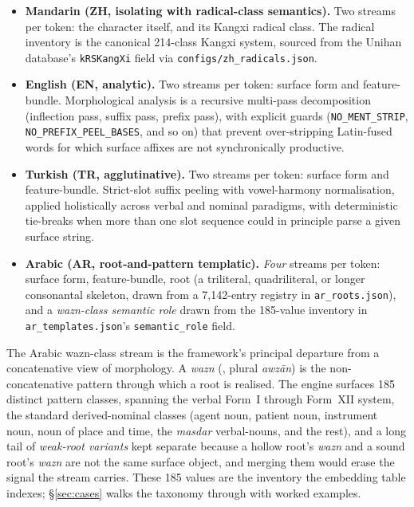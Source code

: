 \begin{itemize}
\item \textbf{Mandarin (ZH, isolating with radical-class semantics).} Two streams per token: the character itself, and its Kangxi radical class. The radical inventory is the canonical 214-class Kangxi system, sourced from the Unihan database's \texttt{kRSKangXi} field via \texttt{configs/zh\_radicals.json}.
\item \textbf{English (EN, analytic).} Two streams per token: surface form and feature-bundle. Morphological analysis is a recursive multi-pass decomposition (inflection pass, suffix pass, prefix pass), with explicit guards (\texttt{NO\_MENT\_STRIP}, \texttt{NO\_PREFIX\_PEEL\_BASES}, and so on) that prevent over-stripping Latin-fused words for which surface affixes are not synchronically productive.
\item \textbf{Turkish (TR, agglutinative).} Two streams per token: surface form and feature-bundle. Strict-slot suffix peeling with vowel-harmony normalisation, applied holistically across verbal and nominal paradigms, with deterministic tie-breaks when more than one slot sequence could in principle parse a given surface string.
\item \textbf{Arabic (AR, root-and-pattern templatic).} \emph{Four} streams per token: surface form, feature-bundle, root (a triliteral, quadriliteral, or longer consonantal skeleton, drawn from a 7{,}142-entry registry in \texttt{ar\_roots.json}), and a \emph{wazn-class semantic role} drawn from the 185-value inventory in \texttt{ar\_templates.json}'s \texttt{semantic\_role} field.
\end{itemize}

The Arabic wazn-class stream is the framework's principal departure from a concatenative view of morphology. A \emph{wazn} (, plural  \emph{awz\=an}) is the non-concatenative pattern through which a root is realised. The engine surfaces 185 distinct pattern classes, spanning the verbal Form~I through Form~XII system, the standard derived-nominal classes (agent noun, patient noun, instrument noun, noun of place and time, the \emph{masdar} verbal-nouns, and the rest), and a long tail of \emph{weak-root variants} kept separate because a hollow root's \emph{wazn} and a sound root's \emph{wazn} are not the same surface object, and merging them would erase the signal the stream carries. These 185 values are the inventory the embedding table indexes; \S\ref{sec:cases} walks the taxonomy through with worked examples.

